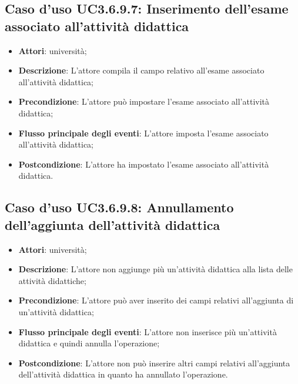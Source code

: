 \subsection{Caso d'uso \texorpdfstring{UC3.6.9.7}{UC3.6.9.7}: Inserimento dell’esame associato all’attività didattica}
\begin{itemize}
\item \textbf{Attori}: università;
\item \textbf{Descrizione}: L'attore compila il campo relativo all'esame associato all'attività didattica;

\item \textbf{Precondizione}: L'attore può impostare l'esame associato all'attività didattica;

\item \textbf{Flusso principale degli eventi}: L'attore imposta l'esame associato all'attività didattica;

\item \textbf{Postcondizione}: L'attore ha impostato l'esame associato all'attività didattica.

\end{itemize}
\subsection{Caso d'uso \texorpdfstring{UC3.6.9.8}{UC3.6.9.8}: Annullamento dell’aggiunta dell’attività didattica}
\begin{itemize}
\item \textbf{Attori}: università;
\item \textbf{Descrizione}: L'attore non aggiunge più un'attività didattica alla lista delle attività didattiche;

\item \textbf{Precondizione}: L'attore può aver inserito dei campi relativi all'aggiunta di un'attività didattica;

\item \textbf{Flusso principale degli eventi}: L'attore non inserisce più un'attività didattica e quindi annulla l'operazione;

\item \textbf{Postcondizione}: L'attore non può inserire altri campi relativi all'aggiunta dell'attività didattica in quanto ha annullato l'operazione.

\end{itemize}

